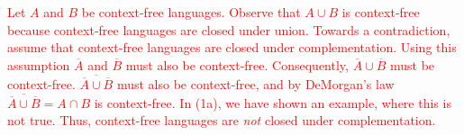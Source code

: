 \textcolor{red}{
    Let $A$ and $B$ be context-free languages. Observe that $A \cup B$ is context-free because context-free languages are closed under union. Towards a contradiction, assume that context-free languages are closed under complementation. Using this assumption $\overline{A}$ and $\overline{B}$ must also be context-free. Consequently, $\overline{A} \cup \overline{B}$ must be context-free. $\overline{\overline{A} \cup \overline{B}}$ must also be context-free, and by DeMorgan's law $\overline{\overline{A} \cup \overline{B}} = A \cap B$ is context-free. In (1a), we have shown an example, where this is not true. Thus, context-free languages are \emph{not} closed under complementation.
}
